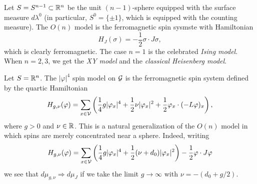 

\begin{example}
Let $S = S^{n-1} \subset {\mathbb R}^n$ be the unit $(n-1)$-sphere equipped with the surface measure $d\lambda^0$ (in particular, $S^0 = \{ \pm 1 \}$, which is equipped with the counting measure). The $O(n)$ model is the
ferromagnetic spin sysmste with Hamiltonian
\begin{equation}
H_J(\sigma) = -\frac{1}{2} \sigma \cdot J \sigma,
\end{equation}
which is clearly ferromagnetic. The case $n = 1$ is the celebrated \emph{Ising model}. When $n = 2, 3$, we get the \emph{XY model} and the \emph{classical Heisenberg model}.
\end{example}



\begin{example}
Let $S = {\mathbb R}^n$. The $|\varphi|^4$ spin model on $\mathcal{G}$ is the ferromagnetic spin system
defined by the quartic Hamiltonian
\begin{equation}
H_{g,\nu}(\varphi)
  =
\sum_{x\in\mathcal{V}}
\left(
  \frac{1}{4} g |\varphi_x|^4
    +
  \frac{1}{2} \nu |\varphi_x|^2
    +
  \frac{1}{2} \varphi_x \cdot (-L \varphi)_x
\right),
\end{equation}
where $g > 0$ and $\nu\in{\mathbb R}$. This is a natural generalization of the $O(n)$ model
in which spins are merely concentrated near a sphere.
Indeed, writing
\begin{equation}
H_{g,\nu}(\varphi)
  =
\sum_{x\in\mathcal{V}}
\left(
  \frac{1}{4} g |\varphi_x|^4
    +
  \frac{1}{2} (\nu + d_0) |\varphi_x|^2
\right)
  -
\frac{1}{2} \varphi \cdot J \varphi
\end{equation}
we see that $d\mu_{g,\nu} \Rightarrow d\mu_J$ if we take the limit $g\to\infty$
with $\nu = -(d_0 + g / 2)$.
\end{example}


